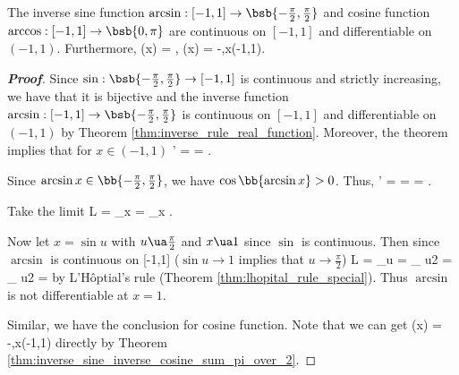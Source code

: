 \begin{theorem}
The inverse sine function $\arcsin:[-1,1]\to \bsb{-\frac{\pi}2,\frac{\pi}2}$ and cosine function $\arccos:[-1,1]\to \bsb{0,\pi}$ are continuous on $[-1,1]$ and differentiable on $(-1,1)$. Furthermore,
\be
{} \arcsin(x) = ,\qquad {} \arccos(x) = -,\qquad x\in (-1,1).
\ee
\end{theorem}

\begin{proof}[\bf Proof]
Since $\sin:\bsb{-\frac{\pi}2,\frac{\pi}2}\to [-1,1]$ is continuous and strictly increasing, we have that it is bijective and the inverse function $\arcsin:[-1,1]\to \bsb{-\frac{\pi}2,\frac{\pi}2}$ is continuous on $[-1,1]$ and differentiable on $(-1,1)$ by Theorem \ref{thm:inverse_rule_real_function}. Moreover, the theorem implies that for $x\in (-1,1)$
\be
{}' =  = .
\ee

Since $\arcsin x \in \bb{-\frac{\pi}2,\frac{\pi}2}$, we have $\cos\bb{\arcsin x}>0$. Thus,
\be
{}' =  =  = .
\ee




Take the limit
\be
L = \lim_{x}  =  \lim_{x} .
\ee

Now let $x=\sin u$ with $u\ua \frac{\pi}2$ and $x\ua 1$ since $\sin$ is continuous. Then since $\arcsin$ is continuous on [-1,1] ($\sin u\to 1$ implies that $u\to \frac{\pi}2$)
\be
L = \lim_{\sin u}  = \lim_{ u\to \frac{\pi}2 }  = \lim_{ u\to \frac{\pi}2 }  = \infty
\ee
by L'H\^optial's rule (Theorem \ref{thm:lhopital_rule_special}). Thus $\arcsin$ is not differentiable at $x=1$.

Similar, we have the conclusion for cosine function. Note that we can get
\be
{} \arccos(x) = -,\qquad x\in (-1,1)
\ee
directly by Theorem \ref{thm:inverse_sine_inverse_cosine_sum_pi_over_2}.
\end{proof}


